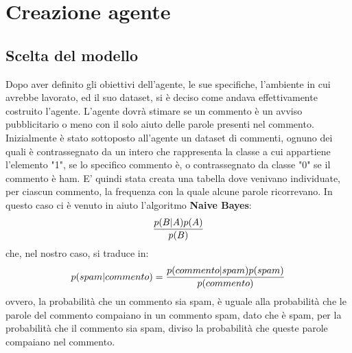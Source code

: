 \documentclass{report}
\begin{document}
    \chapter{Creazione agente}

    \section{Scelta del modello}
    
    Dopo aver definito gli obiettivi dell'agente, le sue specifiche, l'ambiente in cui avrebbe lavorato, ed il suo dataset, si è deciso come andava effettivamente costruito l'agente.
    L'agente dovrà stimare se un commento è un avviso pubblicitario o meno con il solo aiuto delle parole presenti nel commento. Inizialmente è stato sottoposto all'agente 
    un dataset di commenti, ognuno dei quali è contrassegnato da un intero che rappresenta la classe a cui appartiene l'elemento "1", se lo specifico commento è, o contrassegnato da classe "0" se il commento è ham.
    E' quindi stata creata una tabella dove venivano individuate, per ciascun commento,
    la frequenza con la quale alcune parole ricorrevano. In questo caso ci è venuto in aiuto l'algoritmo {\bfseries Naive Bayes}:
    \newline
    \begin{equation}\label{bho}
        { p(B|A)  p(A)\over p(B)}
    \end{equation}
    \newline
    che, nel nostro caso, si traduce in:
    \newline
    \begin{equation}\label{bho2}
        p(spam|commento) = { p(commento|spam)  p(spam)\over p(commento)}
    \end{equation}
    \newline
    ovvero, la probabilità che un commento sia spam, è uguale alla probabilità che le parole del commento compaiano in un commento spam, dato che è spam, per la probabilità 
    che il commento sia spam, diviso la probabilità che queste parole compaiano nel commento.
\end{document}
